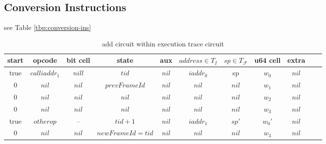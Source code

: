 \subsection{Conversion Instructions}
see Table \ref{tbp:conversion-ins}
\begin{table}[!h]
\begin{center}
\begin{tabular}{ | c | c | c | c | c | c | c | c | c | c | c | }
  \hline
  start & opcode & bit cell & state & aux & $address \in T_{I}$ & $sp \in T_\mathcal{F}$& u64 cell & extra \\ 
  \hline
   true & $call iaddr_1$ & $nill$ & $tid$ & $nil$ & $iaddr_0$ & sp & $w_0$ & $nil$\\ 
 \hline
   0 & $nil$ & $nil$ & $prevFrameId$ & $nil$ & $nil$ & $nil$ & $w_1$ & $nil$\\ 
 \hline
   0 & $nil$ & $nil$ & $nil$ & $nil$ & $nil$ & $nil$ & $w_2$ & $nil$\\ 
 \hline
   0 & $nil$ & $nil$ & $nil$ & $nil$ & $nil$ & $nil$ & $w_3$ & $nil$\\ 
 \hline
   true & $otherop$ & -- & $tid + 1$ & $nil$ & $iaddr_1$ & $sp'$ & $w_0'$ & $nil$\\
 \hline
   0 & $nil$ & $nil$ & $newFrameId = tid$ & $nil$ & $nil$ & $nil$ & $w_3$ & $nil$\\ 
 \hline
\end{tabular}
\caption{add circuit within execution trace circuit}
\label{tbl:conversion-ins}
\end{center}
\end{table}